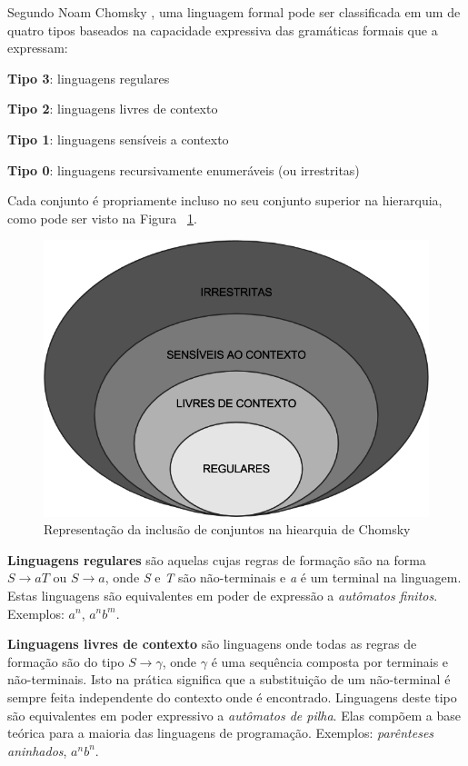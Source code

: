\documentclass[a4paper,12pt,oneside,onecolumn]{uerj}
\begin{document}
Segundo Noam Chomsky \cite{bib:Chomsky57}, uma linguagem formal pode ser classificada em um de quatro tipos baseados na capacidade expressiva das gramáticas formais que a expressam:

\begin{lcircp}
    \item {\bf Tipo 3}: linguagens regulares
    \item {\bf Tipo 2}: linguagens livres de contexto
    \item {\bf Tipo 1}: linguagens sensíveis a contexto
    \item {\bf Tipo 0}: linguagens recursivamente enumeráveis (ou irrestritas)
\end{lcircp}

Cada conjunto é propriamente incluso no seu conjunto superior na hierarquia, como pode ser visto na Figura ~\ref{fig:chomsky}.

\begin{figure}[ht]
  \centering
  \includegraphics[scale=0.5]{figures/chomsky.png}
  \caption{Representação da inclusão de conjuntos na hiearquia de Chomsky}
  \label{fig:chomsky}
\end{figure}

{\bf Linguagens regulares} são aquelas cujas regras de formação são na forma $S \rightarrow aT$ ou $S \rightarrow a$, onde \emph{S} e \emph{T} são não-terminais e \emph{a} é um terminal na linguagem. Estas linguagens são equivalentes em poder de expressão a \emph{autômatos finitos}. Exemplos: $a^n$, $a^nb^m$.

{\bf Linguagens livres de contexto} são linguagens onde todas as regras de formação são do tipo $S \rightarrow \gamma$, onde $\gamma$ é uma sequência composta por terminais e não-terminais. Isto na prática significa que a substituição de um não-terminal é sempre feita independente do contexto onde é encontrado. Linguagens deste tipo são equivalentes em poder expressivo a \emph{autômatos de pilha}. Elas compõem a base teórica para a maioria das linguagens de programação. Exemplos: \emph{parênteses aninhados}, $a^nb^n$.
\end{document}
